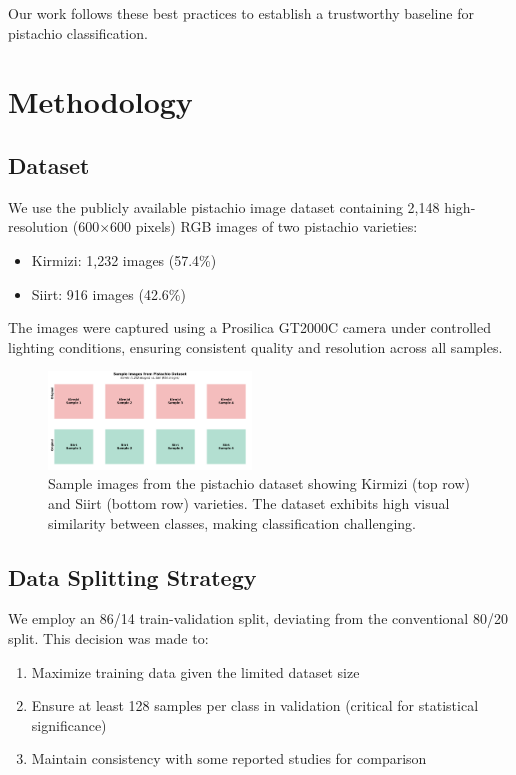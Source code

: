 \documentclass[conference]{IEEEtran}
\begin{document}
Our work follows these best practices to establish a trustworthy baseline for pistachio classification.

\section{Methodology}

\subsection{Dataset}

We use the publicly available pistachio image dataset \cite{koklu2021dataset} containing 2,148 high-resolution (600×600 pixels) RGB images of two pistachio varieties:
\begin{itemize}
    \item Kirmizi: 1,232 images (57.4\%)
    \item Siirt: 916 images (42.6\%)
\end{itemize}

The images were captured using a Prosilica GT2000C camera under controlled lighting conditions, ensuring consistent quality and resolution across all samples.

\begin{figure}[H]
\centering
\includegraphics[width=0.48\textwidth]{figures/sample_images.pdf}
\caption{Sample images from the pistachio dataset showing Kirmizi (top row) and Siirt (bottom row) varieties. The dataset exhibits high visual similarity between classes, making classification challenging.}
\label{fig:sample_images}
\end{figure}

\subsection{Data Splitting Strategy}

We employ an 86/14 train-validation split, deviating from the conventional 80/20 split. This decision was made to:
\begin{enumerate}
    \item Maximize training data given the limited dataset size
    \item Ensure at least 128 samples per class in validation (critical for statistical significance)
    \item Maintain consistency with some reported studies for comparison
\end{enumerate}
\end{document}
